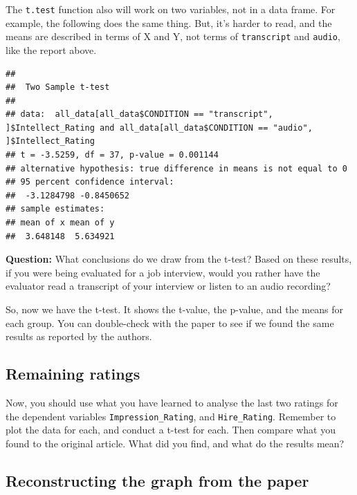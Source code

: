 \documentclass[]{book}
\newenvironment{Shaded}{\begin{snugshade}}{\end{snugshade}}
\newcommand{\KeywordTok}[1]{\textcolor[rgb]{0.13,0.29,0.53}{\textbf{{#1}}}}
\newcommand{\DataTypeTok}[1]{\textcolor[rgb]{0.13,0.29,0.53}{{#1}}}
\newcommand{\StringTok}[1]{\textcolor[rgb]{0.31,0.60,0.02}{{#1}}}
\newcommand{\NormalTok}[1]{{#1}}
\theoremstyle{definition}
\theoremstyle{definition}
\theoremstyle{definition}
\theoremstyle{remark}
\begin{document}
The \texttt{t.test} function also will work on two variables, not in a
data frame. For example, the following does the same thing. But, it's
harder to read, and the means are described in terms of X and Y, not
terms of \texttt{transcript} and \texttt{audio}, like the report above.

\begin{Shaded}
\end{Shaded}

\begin{verbatim}
## 
##  Two Sample t-test
## 
## data:  all_data[all_data$CONDITION == "transcript", ]$Intellect_Rating and all_data[all_data$CONDITION == "audio", ]$Intellect_Rating
## t = -3.5259, df = 37, p-value = 0.001144
## alternative hypothesis: true difference in means is not equal to 0
## 95 percent confidence interval:
##  -3.1284798 -0.8450652
## sample estimates:
## mean of x mean of y 
##  3.648148  5.634921
\end{verbatim}

\textbf{Question:} What conclusions do we draw from the t-test? Based on
these results, if you were being evaluated for a job interview, would
you rather have the evaluator read a transcript of your interview or
listen to an audio recording?

So, now we have the t-test. It shows the t-value, the p-value, and the
means for each group. You can double-check with the paper to see if we
found the same results as reported by the authors.

\subsection{Remaining ratings}\label{remaining-ratings}

Now, you should use what you have learned to analyse the last two
ratings for the dependent variables \texttt{Impression\_Rating}, and
\texttt{Hire\_Rating}. Remember to plot the data for each, and conduct a
t-test for each. Then compare what you found to the original article.
What did you find, and what do the results mean?

\subsection{Reconstructing the graph from the
paper}\label{reconstructing-the-graph-from-the-paper}
\end{document}
